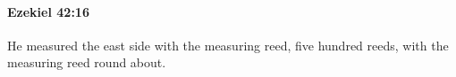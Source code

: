 
		\paragraph{Ezekiel 42:16} %
			\label{EZEKIEL-42-16}

			He measured the east side with the measuring reed, five hundred reeds, with the measuring reed round about.



